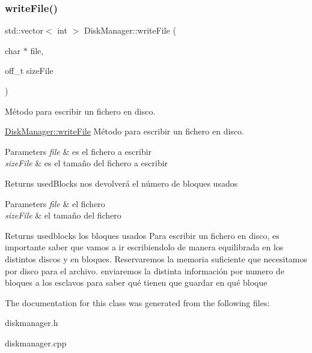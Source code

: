 \subsubsection{\texorpdfstring{write\+File()}{writeFile()}}
{\footnotesize\ttfamily std\+::vector$<$ int $>$ Disk\+Manager\+::write\+File (\begin{DoxyParamCaption}\item[{char $\ast$}]{file,  }\item[{off\+\_\+t}]{size\+File }\end{DoxyParamCaption})}



Método para escribir un fichero en disco. 

\hyperlink{classDiskManager_a864cc38c2a8b2beb355bec5bf55b8658}{Disk\+Manager\+::write\+File} Método para escribir un fichero en disco.


\begin{DoxyParams}{Parameters}
{\em file} & es el fichero a escribir \\
\hline
{\em size\+File} & es el tamaño del fichero a escribir \\
\hline
\end{DoxyParams}
\begin{DoxyReturn}{Returns}
used\+Blocks nos devolverá el número de bloques usados
\end{DoxyReturn}

\begin{DoxyParams}{Parameters}
{\em file} & el fichero \\
\hline
{\em size\+File} & el tamaño del fichero \\
\hline
\end{DoxyParams}
\begin{DoxyReturn}{Returns}
usedblocks los bloques usados Para escribir un fichero en disco, es importante saber que vamos a ir escribiendolo de manera equilibrada en los distintos discos y en bloques. Reservaremos la memoria suficiente que necesitamos por disco para el archivo. enviaremos la distinta información por numero de bloques a los esclavos para saber qué tienen que guardar en qué bloque 
\end{DoxyReturn}


The documentation for this class was generated from the following files\+:\begin{DoxyCompactItemize}
\item 
diskmanager.\+h\item 
diskmanager.\+cpp\end{DoxyCompactItemize}
